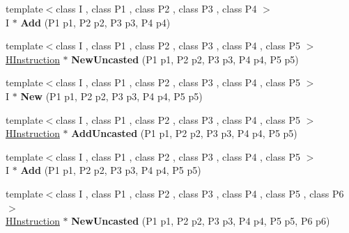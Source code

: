 \begin{DoxyCompactItemize}
\item 
\hypertarget{classv8_1_1internal_1_1_h_graph_builder_a9dcd4e4fc37ede14981a0529dd443af3}{}{\footnotesize template$<$class I , class P1 , class P2 , class P3 , class P4 $>$ }\\I $\ast$ {\bfseries Add} (P1 p1, P2 p2, P3 p3, P4 p4)\label{classv8_1_1internal_1_1_h_graph_builder_a9dcd4e4fc37ede14981a0529dd443af3}

\item 
\hypertarget{classv8_1_1internal_1_1_h_graph_builder_a6c505a1dd7dc3477154ccdfd969714bf}{}{\footnotesize template$<$class I , class P1 , class P2 , class P3 , class P4 , class P5 $>$ }\\\hyperlink{classv8_1_1internal_1_1_h_instruction}{H\+Instruction} $\ast$ {\bfseries New\+Uncasted} (P1 p1, P2 p2, P3 p3, P4 p4, P5 p5)\label{classv8_1_1internal_1_1_h_graph_builder_a6c505a1dd7dc3477154ccdfd969714bf}

\item 
\hypertarget{classv8_1_1internal_1_1_h_graph_builder_a7295038551d619d0679f3343b3b787ce}{}{\footnotesize template$<$class I , class P1 , class P2 , class P3 , class P4 , class P5 $>$ }\\I $\ast$ {\bfseries New} (P1 p1, P2 p2, P3 p3, P4 p4, P5 p5)\label{classv8_1_1internal_1_1_h_graph_builder_a7295038551d619d0679f3343b3b787ce}

\item 
\hypertarget{classv8_1_1internal_1_1_h_graph_builder_a0c4b81ac0c9e8a6a57d633e5b0eec946}{}{\footnotesize template$<$class I , class P1 , class P2 , class P3 , class P4 , class P5 $>$ }\\\hyperlink{classv8_1_1internal_1_1_h_instruction}{H\+Instruction} $\ast$ {\bfseries Add\+Uncasted} (P1 p1, P2 p2, P3 p3, P4 p4, P5 p5)\label{classv8_1_1internal_1_1_h_graph_builder_a0c4b81ac0c9e8a6a57d633e5b0eec946}

\item 
\hypertarget{classv8_1_1internal_1_1_h_graph_builder_a24cb3477ef726cbccbe93ddec0b8894b}{}{\footnotesize template$<$class I , class P1 , class P2 , class P3 , class P4 , class P5 $>$ }\\I $\ast$ {\bfseries Add} (P1 p1, P2 p2, P3 p3, P4 p4, P5 p5)\label{classv8_1_1internal_1_1_h_graph_builder_a24cb3477ef726cbccbe93ddec0b8894b}

\item 
\hypertarget{classv8_1_1internal_1_1_h_graph_builder_a4d53a60ad9189df924c282a10cf5d73e}{}{\footnotesize template$<$class I , class P1 , class P2 , class P3 , class P4 , class P5 , class P6 $>$ }\\\hyperlink{classv8_1_1internal_1_1_h_instruction}{H\+Instruction} $\ast$ {\bfseries New\+Uncasted} (P1 p1, P2 p2, P3 p3, P4 p4, P5 p5, P6 p6)\label{classv8_1_1internal_1_1_h_graph_builder_a4d53a60ad9189df924c282a10cf5d73e}


\end{DoxyCompactItemize}
